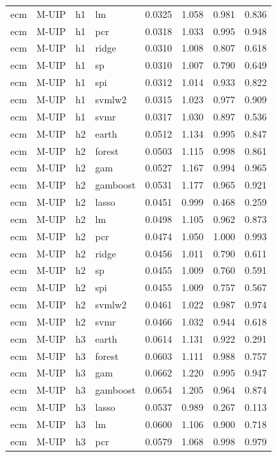 \begin{ThreePartTable}
\begin{longtable}[t]{llclcccc}
ecm & M-UIP & h1 & lm & 0.0325 & 1.058 & 0.981 & 0.836\\
ecm & M-UIP & h1 & pcr & 0.0318 & 1.033 & 0.995 & 0.948\\
ecm & M-UIP & h1 & ridge & 0.0310 & 1.008 & 0.807 & 0.618\\
ecm & M-UIP & h1 & sp & 0.0310 & 1.007 & 0.790 & 0.649\\
ecm & M-UIP & h1 & spi & 0.0312 & 1.014 & 0.933 & 0.822\\
ecm & M-UIP & h1 & svmlw2 & 0.0315 & 1.023 & 0.977 & 0.909\\
ecm & M-UIP & h1 & svmr & 0.0317 & 1.030 & 0.897 & 0.536\\
\addlinespace
ecm & M-UIP & h2 & earth & 0.0512 & 1.134 & 0.995 & 0.847\\
ecm & M-UIP & h2 & forest & 0.0503 & 1.115 & 0.998 & 0.861\\
ecm & M-UIP & h2 & gam & 0.0527 & 1.167 & 0.994 & 0.965\\
ecm & M-UIP & h2 & gamboost & 0.0531 & 1.177 & 0.965 & 0.921\\
ecm & M-UIP & h2 & lasso & 0.0451 & 0.999 & 0.468 & 0.259\\
ecm & M-UIP & h2 & lm & 0.0498 & 1.105 & 0.962 & 0.873\\
ecm & M-UIP & h2 & pcr & 0.0474 & 1.050 & 1.000 & 0.993\\
ecm & M-UIP & h2 & ridge & 0.0456 & 1.011 & 0.790 & 0.611\\
ecm & M-UIP & h2 & sp & 0.0455 & 1.009 & 0.760 & 0.591\\
ecm & M-UIP & h2 & spi & 0.0455 & 1.009 & 0.757 & 0.567\\
ecm & M-UIP & h2 & svmlw2 & 0.0461 & 1.022 & 0.987 & 0.974\\
ecm & M-UIP & h2 & svmr & 0.0466 & 1.032 & 0.944 & 0.618\\
\addlinespace
ecm & M-UIP & h3 & earth & 0.0614 & 1.131 & 0.922 & 0.291\\
ecm & M-UIP & h3 & forest & 0.0603 & 1.111 & 0.988 & 0.757\\
ecm & M-UIP & h3 & gam & 0.0662 & 1.220 & 0.995 & 0.947\\
ecm & M-UIP & h3 & gamboost & 0.0654 & 1.205 & 0.964 & 0.874\\
ecm & M-UIP & h3 & lasso & 0.0537 & 0.989 & 0.267 & 0.113\\
ecm & M-UIP & h3 & lm & 0.0600 & 1.106 & 0.900 & 0.718\\
ecm & M-UIP & h3 & pcr & 0.0579 & 1.068 & 0.998 & 0.979\\

\end{longtable}
\end{ThreePartTable}
